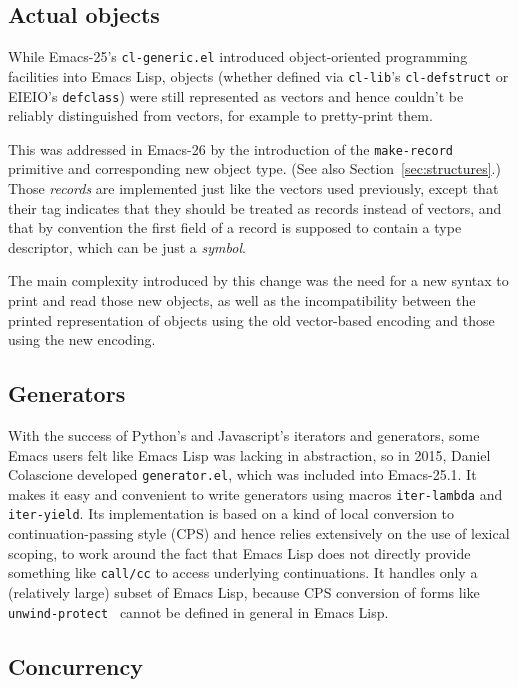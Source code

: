 \documentclass[format=acmsmall, review]{acmart}
\newcommand \Elisp {Emacs Lisp}
\begin{document}
\subsection{Actual objects}  %
\label{sec:actual-objects}

While Emacs-25's \texttt{cl-generic.el} introduced object-oriented
programming facilities into \Elisp{}, objects (whether defined via
\texttt{cl-lib}'s \texttt{cl-defstruct} or EIEIO's \texttt{defclass}) were
still represented as vectors and hence couldn't be reliably distinguished
from vectors, for example to pretty-print them.

This was addressed in Emacs-26 by the introduction of the
\texttt{make-record} primitive and corresponding new object type.
(See also Section~\ref{sec:structures}.)
Those \emph{records} are implemented just like the vectors used previously,
except that their tag indicates that they should be treated as records
instead of vectors, and that by convention the first field of a record is
supposed to contain a type descriptor, which can be just a \emph{symbol}.

The main complexity introduced by this change was the need for a new syntax
to print and read those new objects, as well as the incompatibility between
the printed representation of objects using the old vector-based encoding
and those using the new encoding.

\subsection{Generators}
\label{sec:generators}

With the success of Python's and Javascript's iterators and generators, some
Emacs users felt like \Elisp{} was lacking in abstraction, so in 2015,
Daniel Colascione developed \texttt{generator.el}, which was included
into Emacs-25.1.  It makes it easy and convenient to write generators using
macros \texttt{iter-lambda} and \texttt{iter-yield}.  Its implementation is
based on a kind of local conversion to continuation-passing style (CPS) and
hence relies extensively on the use of lexical scoping, to work around the
fact that \Elisp{} does not directly provide something like \texttt{call/cc}
to access underlying continuations.  It handles only a (relatively large)
subset of \Elisp{}, because CPS conversion of forms like
\texttt{unwind-protect}~\cite{HaynesFriedman1987} cannot be defined in general in \Elisp.

\subsection{Concurrency}
\label{sec:concurrency}
\end{document}
